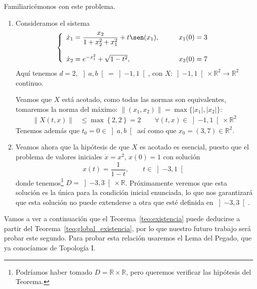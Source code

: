 \begin{ejemplo}
    Familiaricémonos con este problema.
    \begin{enumerate}
        \item Consideramos el sistema
            \begin{equation*}
                \left\{\begin{array}{ll}
                     \dot{x}_1 = \dfrac{x_2}{1+x_2^2 + x_1^2} + t\sen(x_1),& \qquad x_1(0) = 3 \\
                                                                           &\\
                     \dot{x}_2 = e^{-x_1^2} + \sqrt{1-t^2},& \qquad x_2(0) = 7 \\
                \end{array}\right. 
            \end{equation*}
            Aquí tenemos $d=2$, $\left]a,b\right[ = \left]-1,1\right[$, con $X:\left]-1,1\right[\times \mathbb{R}^2\to \mathbb{R}^2$ continuo.

            Veamos que $X$ está acotado, como todas las normas son equivalentes, tomaremos la norma del máximo: $\|(x_1,x_2)\| = \max\{|x_1|,|x_2|\}$:
            \begin{align*}
                \|X(t,x)\| &\leq\max\left\{2,2\right\} = 2 \qquad \forall (t,x)\in \left]-1,1\right[\times \mathbb{R}^2
            \end{align*}
            Tenemos además que $t_0 = 0\in \left]a,b\right[$ así como que $x_0 = (3,7) \in \mathbb{R}^2$.
        \item Veamos ahora que la hipótesis de que $X$ es acotado es esencial, puesto que el problema de valores iniciales $\dot{x} = x^2$, $x(0) = 1$ con solución
            \begin{equation*}
                x(t) = \frac{1}{1-t}, \qquad t\in \left]-3,1\right[
            \end{equation*}
            donde tenemos\footnote{Podríamos haber tomado $D=\mathbb{R}\times \mathbb{R}$, pero queremos verificar las hipótesis del Teorema.} $D=\left]-3,3\right[\times \mathbb{R}$. Próximamente veremos que esta solución es la única para la condición inicial enunciada, lo que nos garantizará que esta solución no puede extenderse a otra que esté definida en $\left]-3,3\right[$.
    \end{enumerate}
\end{ejemplo}

\noindent
Vamos a ver a continuación que el Teorema~\ref{teo:existencia} puede deducirse a partir del Teorema~\ref{teo:global_existencia}, por lo que nuestro futuro trabajo será probar este segundo. Para probar esta relación usaremos el Lema del Pegado, que ya conocíamos de Topología I.

